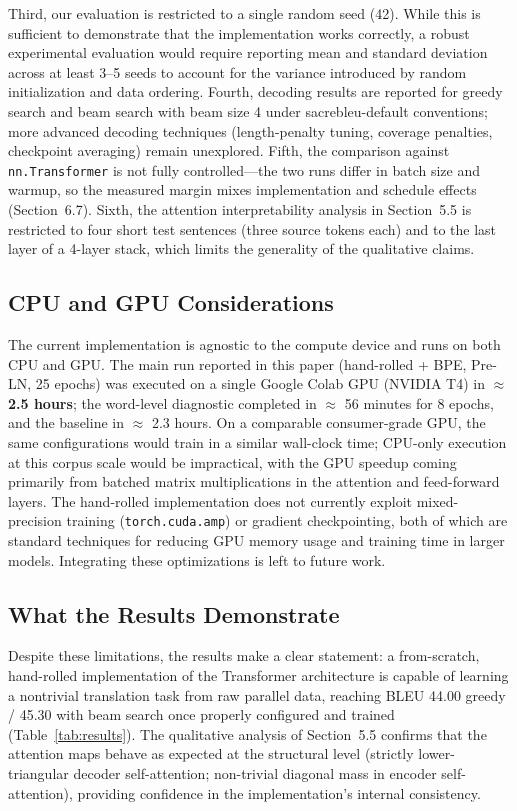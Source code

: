 \documentclass[10pt]{article}
\begin{document}
Third, our evaluation is restricted to a single random seed (42). While this is sufficient to demonstrate that the implementation works correctly, a robust experimental evaluation would require reporting mean and standard deviation across at least 3--5 seeds to account for the variance introduced by random initialization and data ordering. Fourth, decoding results are reported for greedy search and beam search with beam size 4 under sacrebleu-default conventions; more advanced decoding techniques (length-penalty tuning, coverage penalties, checkpoint averaging) remain unexplored. Fifth, the comparison against \texttt{nn.Transformer} is not fully controlled---the two runs differ in batch size and warmup, so the measured margin mixes implementation and schedule effects (Section~6.7). Sixth, the attention interpretability analysis in Section~5.5 is restricted to four short test sentences (three source tokens each) and to the last layer of a 4-layer stack, which limits the generality of the qualitative claims.

\subsection{CPU and GPU Considerations}

The current implementation is agnostic to the compute device and runs on both CPU and GPU. The main run reported in this paper (hand-rolled + BPE, Pre-LN, 25 epochs) was executed on a single Google Colab GPU (NVIDIA T4) in \textbf{$\approx$ 2.5 hours}; the word-level diagnostic completed in $\approx$ 56 minutes for 8 epochs, and the baseline in $\approx$ 2.3 hours. On a comparable consumer-grade GPU, the same configurations would train in a similar wall-clock time; CPU-only execution at this corpus scale would be impractical, with the GPU speedup coming primarily from batched matrix multiplications in the attention and feed-forward layers. The hand-rolled implementation does not currently exploit mixed-precision training (\texttt{torch.cuda.amp}) or gradient checkpointing, both of which are standard techniques for reducing GPU memory usage and training time in larger models. Integrating these optimizations is left to future work.

\subsection{What the Results Demonstrate}

Despite these limitations, the results make a clear statement: a from-scratch, hand-rolled implementation of the Transformer architecture is capable of learning a nontrivial translation task from raw parallel data, reaching BLEU 44.00 greedy / 45.30 with beam search once properly configured and trained (Table~\ref{tab:results}). The qualitative analysis of Section~5.5 confirms that the attention maps behave as expected at the structural level (strictly lower-triangular decoder self-attention; non-trivial diagonal mass in encoder self-attention), providing confidence in the implementation's internal consistency.
\end{document}
